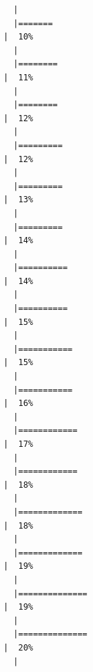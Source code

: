 \documentclass[
  letterpaper,
  DIV=11,
  numbers=noendperiod]{scrreprt}
\begin{document}
\begin{verbatim}
  |                                                                            
  |=======                                                               |  10%
  |                                                                            
  |========                                                              |  11%
  |                                                                            
  |========                                                              |  12%
  |                                                                            
  |=========                                                             |  12%
  |                                                                            
  |=========                                                             |  13%
  |                                                                            
  |=========                                                             |  14%
  |                                                                            
  |==========                                                            |  14%
  |                                                                            
  |==========                                                            |  15%
  |                                                                            
  |===========                                                           |  15%
  |                                                                            
  |===========                                                           |  16%
  |                                                                            
  |============                                                          |  17%
  |                                                                            
  |============                                                          |  18%
  |                                                                            
  |=============                                                         |  18%
  |                                                                            
  |=============                                                         |  19%
  |                                                                            
  |==============                                                        |  19%
  |                                                                            
  |==============                                                        |  20%
  |                                                                            

\end{verbatim}
\end{document}
